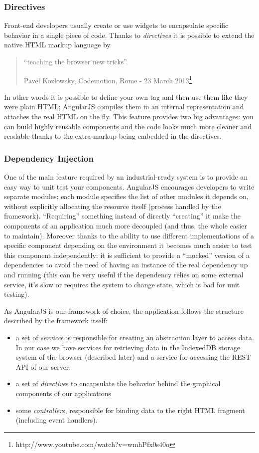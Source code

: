 \documentclass[a4paper,12pt]{report}
\begin{document}
\subsubsection{Directives}
Front-end developers usually create or use widgets to encapsulate specific behavior in a single piece of code. Thanks to \emph{directives} it is possible to extend the native HTML markup language by \begin{quotation}
``teaching the browser new tricks''.
\begin{flushright}
Pavel Kozlowsky, Codemotion, Rome - 23 March 2013\footnote{http://www.youtube.com/watch?v=wmhPfx0s40o}
\end{flushright}
\end{quotation}
In other words it is possible to define your own tag and then use them like they were plain HTML; AngularJS compiles them in an internal representation and attaches the real HTML on the fly.
This feature provides two big advantages: you can build highly reusable components and the code looks much more cleaner and readable thanks to the extra markup being embedded in the directives. 
\subsubsection{Dependency Injection}
One of the main feature required by an industrial-ready system is to provide an easy way to unit test your components. AngularJS encourages developers to write separate modules; each module specifies the list of other modules it depends on, without explicitly allocating the resource itself (process handled by the framework). ``Requiring'' something instead of directly ``creating'' it make the components of an application much more decoupled (and thus, the whole easier to maintain). Moreover thanks to the ability to use different implementations of a specific component depending on the environment it becomes much easier to test this component independently: it is sufficient to provide a ``mocked'' version of a dependencies to avoid the need of having an instance of the real dependency up and running (this can be very useful if the dependency relies on some external service, it's slow or requires the system to change state, which is bad for unit testing).


As AngularJS is our framework of choice, the application follows the structure described by the framework itself:
\begin{itemize}
\item a set of \emph{service}s is responsible for creating an abstraction layer to access data. In our case we have services for retrieving data in the IndexedDB storage system of the browser (described later) and a service for accessing the REST API of our server.
\item a set of \emph{directive}s to encapsulate the behavior behind the graphical components of our applications 
\item some \emph{controller}s, responsible for binding data to the right HTML fragment (including event handlers).
\end{itemize}
\end{document}
